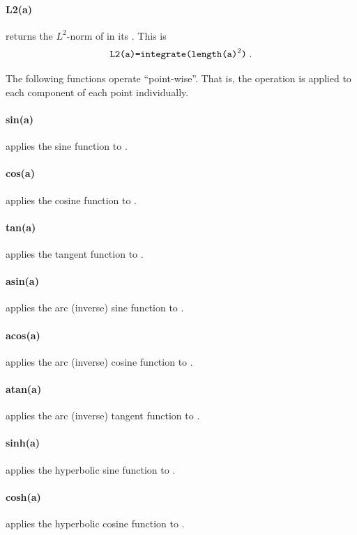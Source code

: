 \paragraph{L2(a)}
returns the $L^2$-norm of  in its \FunctionSpace. This is
\begin{equation}
\code{L2(a)=integrate(length(a)}^2\code{)} \; .
\end{equation}


\noindent The following functions operate ``point-wise''.
That is, the operation is applied to each component of each point individually.

\paragraph{sin(a)}
applies the sine function to .


\paragraph{cos(a)}
applies the cosine function to .


\paragraph{tan(a)}
applies the tangent function to .


\paragraph{asin(a)}
applies the arc (inverse) sine function to .


\paragraph{acos(a)}
applies the arc (inverse) cosine function to .


\paragraph{atan(a)}
applies the arc (inverse) tangent function to .


\paragraph{sinh(a)}
applies the hyperbolic sine function to .


\paragraph{cosh(a)}
applies the hyperbolic cosine function to .


